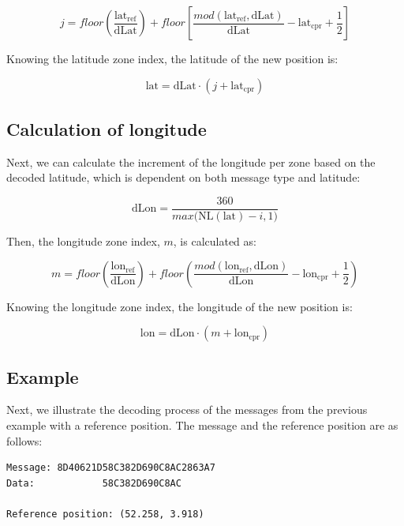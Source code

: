 \begin{equation}
  j = floor \left( \frac{\mathrm{lat}_\mathrm{ref}}{\mathrm{dLat}} \right) + floor \left[ \frac{mod(\mathrm{lat}_\mathrm{ref}, \mathrm{dLat})}{\mathrm{dLat}}  - \mathrm{lat}_\mathrm{cpr}  + \frac{1}{2} \right]
\end{equation}

Knowing the latitude zone index, the latitude of the new position is:

\begin{equation}
  \mathrm{lat} = \mathrm{dLat} \cdot (j + \mathrm{lat}_\mathrm{cpr})
\end{equation}


\subsection{Calculation of longitude}

Next, we can calculate the increment of the longitude per zone based on the decoded latitude, which is dependent on both message type and latitude:

\begin{equation}
  \mathrm{dLon} = \frac{360}{max\Big( \mathrm{NL}(\mathrm{lat})-i, 1 \Big)}
\end{equation}


Then, the longitude zone index, $m$, is calculated as:

\begin{equation}
  m = floor \left( \frac{\mathrm{lon}_\mathrm{ref}}{\mathrm{dLon}} \right) + floor \left( \frac{mod(\mathrm{lon}_\mathrm{ref}, \mathrm{dLon})}{\mathrm{dLon}}  - \mathrm{lon}_\mathrm{cpr}  + \frac{1}{2}  \right)
\end{equation}

Knowing the longitude zone index, the longitude of the new position is:

\begin{equation}
  \mathrm{lon} = \mathrm{dLon} \cdot (m + \mathrm{lon}_\mathrm{cpr})
\end{equation}


\subsection{Example}

Next, we illustrate the decoding process of the messages from the previous example with a reference position. The message and the reference position are as follows:

\begin{verbatim}
Message: 8D40621D58C382D690C8AC2863A7
Data:            58C382D690C8AC

Reference position: (52.258, 3.918)
\end{verbatim}

